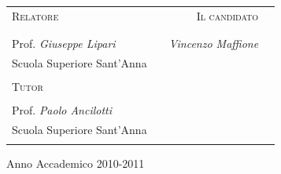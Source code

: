 \begin{titlepage}
\vspace{1.5cm}



\begin{center}
\begin{tabular}{l p{3.3cm} r c}

\textsc{Relatore} & & \textsc{Il candidato} \\
&&\\
\dotfill&&\dotfill \\
Prof. \textit{Giuseppe Lipari} & &\textit{Vincenzo Maffione}\\
{\small Scuola Superiore Sant'Anna} & &\\
 & &  \\
\textsc{Tutor} & &  \\
 \dotfill&&\\
Prof. \textit{Paolo Ancilotti} && \\
{\small Scuola Superiore Sant'Anna} && \\
 & & \\

\end{tabular}
\end{center}

\vspace{0cm}


\begin{center}
Anno Accademico 2010-2011
\end{center}
\par
\vfill\par 
\clearpage
\endgroup
  

\end{titlepage}

\newpage                                
\clearpage{\pagestyle{empty}\cleardoublepage}




